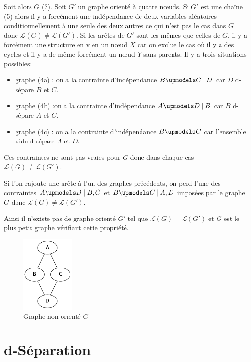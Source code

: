 \documentclass{article}
\begin{document}
Soit alors $G$ (3). Soit $G'$ un graphe orienté à quatre nœuds. Si $G'$ est
une chaîne (5) alors il y a forcément une indépendance de deux variables
aléatoires conditionnellement à une seule des deux autres ce qui n'est pas le
cas dans $G$ donc $\mathcal{L}(G) \neq \mathcal{L}(G')$. Si les arêtes de $G'$
sont les mêmes que celles de $G$, il y a forcément une structure en v en un
nœud $X$ car on exclue le cas où il y a des cycles et il y a de même forcément
un nœud $Y$ sans parents. Il y a trois situations possibles:

\begin{itemize}
  \item graphe (4a) : on a la contrainte d'indépendance $B \upmodels C \mid D$
  car $D$ d-sépare $B $ et $C$.
  \item graphe (4b) :on a la contrainte d'indépendance $A \upmodels D \mid B$
  car $B$ d-sépare $A$ et $C$.
  \item graphe (4c) : on a la contrainte d'indépendance $B \upmodels C$ car
  l'ensemble vide d-sépare $A$ et $D$.
\end{itemize} 

Ces contraintes ne sont pas vraies pour $G$ donc dans chaque cas
$\mathcal{L}(G) \neq \mathcal{L}(G')$.

Si l'on rajoute une arête à l'un des graphes précédents, on perd l'une des
contraintes $A \upmodels D \mid B,C$ et $B \upmodels C \mid A,D$ imposées par
le graphe $G$ donc $\mathcal{L}(G) \neq \mathcal{L}(G')$.

Ainsi il n'existe pas de graphe orienté $G'$ tel que $\mathcal{L}(G) =
\mathcal{L}(G')$ et $G$ est le plus petit graphe vérifiant cette propriété.

\begin{figure}[h]
\caption{Graphe non orienté $G$}
\includegraphics[width=100px]{Ia.png}
\end{figure}

\section{d-Séparation}
\end{document}
